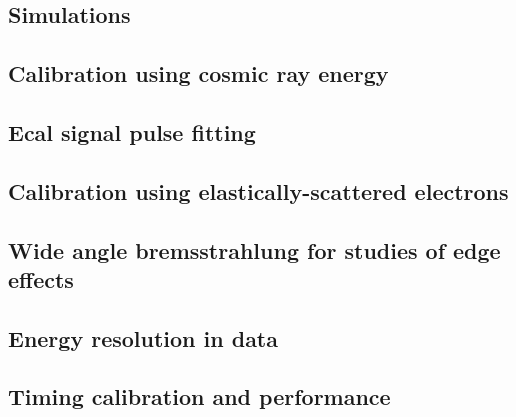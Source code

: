 \documentclass[12pt]{report}
\begin{document}
\subsection{Simulations}


\subsection{Calibration using cosmic ray energy}


\subsection{Ecal signal pulse fitting} \label{pulsefitting}


\subsection{Calibration using elastically-scattered electrons}


\subsection{Wide angle bremsstrahlung for studies of edge effects}


\subsection{Energy resolution in data}


\subsection{Timing calibration and performance}


\end{document}
